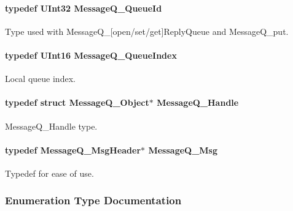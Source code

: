 \paragraph[{MessageQ\_\-QueueId}]{\setlength{\rightskip}{0pt plus 5cm}typedef UInt32 {\bf MessageQ\_\-QueueId}}\hfill\label{_message_q_8h_a34dd32b58cf0476c2d90e3f702843297}


Type used with MessageQ\_\-\mbox{[}open/set/get\mbox{]}ReplyQueue and MessageQ\_\-put. 

\paragraph[{MessageQ\_\-QueueIndex}]{\setlength{\rightskip}{0pt plus 5cm}typedef UInt16 {\bf MessageQ\_\-QueueIndex}}\hfill\label{_message_q_8h_a22a5f41fd82f03f7c14f45dab647bada}


Local queue index. 

\paragraph[{MessageQ\_\-Handle}]{\setlength{\rightskip}{0pt plus 5cm}typedef struct MessageQ\_\-Object$\ast$ {\bf MessageQ\_\-Handle}}\hfill\label{_message_q_8h_a1d584ce08733ca864d81e1e64a41cf7a}


MessageQ\_\-Handle type. 

\paragraph[{MessageQ\_\-Msg}]{\setlength{\rightskip}{0pt plus 5cm}typedef {\bf MessageQ\_\-MsgHeader}$\ast$ {\bf MessageQ\_\-Msg}}\hfill\label{_message_q_8h_ab675d3cdd0443a1ad05658d375458204}


Typedef for ease of use. 



\subsubsection{Enumeration Type Documentation}
